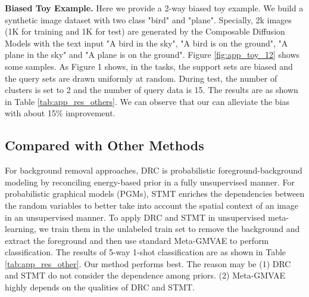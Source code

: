 \documentclass[letterpaper]{article} \usepackage{aaai23}  \usepackage{times}  \usepackage{helvet}  \usepackage{courier}  \usepackage[hyphens]{url}  \usepackage{graphicx} \urlstyle{rm} \def\UrlFont{\rm}  \usepackage{natbib}  \usepackage{caption} \frenchspacing  \setlength{\pdfpagewidth}{8.5in}  \setlength{\pdfpageheight}{11in}  \usepackage{algorithm}
\theoremstyle{plain}
\theoremstyle{definition}
\theoremstyle{remark}
\begin{document}
\textbf{Biased Toy Example.}
Here we provide a 2-way biased toy example. We build a synthetic image dataset with two class "bird" and "plane". Specially, 2k images (1K for training and 1K for test) are generated by the Composable Diffusion Models \cite{liu2022compositional}  with the text input "A bird in the sky", "A bird is on the ground", "A plane in the sky" and "A plane is on the ground". Figure \ref{fig:app_toy_12} shows some samples.  As Figure 1 shows, in the tasks, the support sets are biased and the query sets are drawn uniformly at random. During test, the number of clusters is set to 2 and the number of query data is 15.  The results are as shown in Table \ref{tab:app_res_others}. We can observe that our can alleviate the bias with about 15\% improvement. 






\subsection{Compared with Other Methods}
For background removal approaches, DRC \cite{yu2021unsupervised} is probabilistic foreground-background modeling by reconciling energy-based prior in a fully unsupervised manner. For probabilistic graphical models (PGMs), STMT \cite{9414435} enriches the dependencies between the random variables to better take into account the spatial context of an image in an unsupervised manner. To apply DRC and STMT in unsupervised meta-learning, we train them in the unlabeled train set to remove the background and extract the foreground and then use standard Meta-GMVAE to perform classification. The results of 5-way 1-shot classification are as shown in Table \ref{tab:app_res_other}. Our method performs best. The reason may be (1) DRC and STMT do not consider the dependence among priors. (2) Meta-GMVAE highly depends on the qualities of DRC and STMT.
\end{document}
